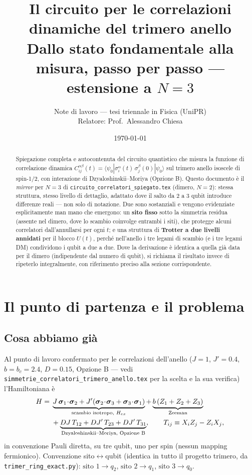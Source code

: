 \documentclass[11pt,a4paper]{article}
\title{Il circuito per le correlazioni dinamiche del trimero anello\\
\large Dallo stato fondamentale alla misura, passo per passo --- estensione a $N=3$}
\author{Note di lavoro --- tesi triennale in Fisica (UniPR)\\
Relatore: Prof.\ Alessandro Chiesa}
\date{\today}
\begin{document}
\maketitle

\begin{abstract}
\noindent
Spiegazione completa e autocontenuta del circuito quantistico che misura la funzione di
correlazione dinamica $C_{ij}^{\alpha\beta}(t)=\langle\psi_0|\sigma_i^\alpha(t)\,
\sigma_j^\beta(0)|\psi_0\rangle$ sul trimero anello isoscele di spin-1/2, con interazione di
Dzyaloshinskii--Moriya (Opzione B). Questo documento è il \emph{mirror} per $N=3$ di
\texttt{circuito\_correlatori\_spiegato.tex} (dimero, $N=2$): stessa struttura, stesso livello di
dettaglio, adattato dove il salto da 2 a 3 qubit introduce differenze reali --- non solo di
notazione. Due sono sostanziali e vengono evidenziate esplicitamente man mano che emergono: un
\textbf{sito fisso} sotto la simmetria residua (assente nel dimero, dove lo scambio coinvolge
entrambi i siti), che protegge alcuni correlatori dall'annullarsi per ogni $t$; e una struttura di
\textbf{Trotter a due livelli annidati} per il blocco $U(t)$, perché nell'anello i tre legami di
scambio (e i tre legami DM) condividono i qubit a due a due. Dove la derivazione è identica a
quella già data per il dimero (indipendente dal numero di qubit), si richiama il risultato invece
di ripeterlo integralmente, con riferimento preciso alla sezione corrispondente.
\end{abstract}

\tableofcontents

\section{Il punto di partenza e il problema}

\subsection{Cosa abbiamo già}

Al punto di lavoro confermato per le correlazioni dell'anello ($J=1$, $J'=0.4$, $b=b_c=2.4$,
$D=0.15$, Opzione B --- vedi \texttt{simmetrie\_correlatori\_trimero\_anello.tex} per la scelta e
la sua verifica) l'Hamiltoniana è
\begin{align}
H ={}& \underbrace{J\,\boldsymbol\sigma_1\!\cdot\!\boldsymbol\sigma_2
     + J'(\boldsymbol\sigma_2\!\cdot\!\boldsymbol\sigma_3+\boldsymbol\sigma_3\!\cdot\!\boldsymbol\sigma_1)}_{\text{scambio isotropo, }H_{ex}}
     + \underbrace{b\,(Z_1+Z_2+Z_3)}_{\text{Zeeman}} \notag\\
     &+ \underbrace{D J\,T_{12} + DJ'\,T_{23} + DJ'\,T_{31}}_{\text{Dzyaloshinskii--Moriya, Opzione B}},
     \qquad T_{ij}\equiv X_iZ_j-Z_iX_j,
\label{eq:H}
\end{align}
in convenzione Pauli diretta, su tre qubit, uno per spin (nessun mapping fermionico). Convenzione
sito$\leftrightarrow$qubit (identica in tutto il progetto trimero, da \texttt{trimer\_ring\_exact.py}):
$\text{sito }1\to q_2$, $\text{sito }2\to q_1$, $\text{sito }3\to q_0$.
\end{document}
